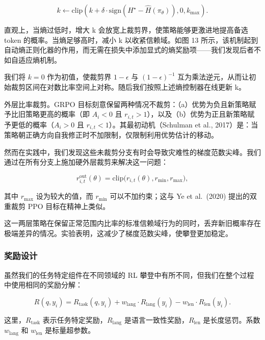 \documentclass[
  10
]{article}
\begin{document}
\[
k \gets \mathrm { c l i p } \left( k + \delta \cdot \mathrm { s i g n } \left( H ^ { \star } - \hat { H } ( \pi _ { \theta } ) \right) , 0 , k _ { \mathrm { m a x } } \right) .\tag{8}
\]

直观上，当熵过低时，增大 k 会放宽上裁剪界，使策略能够更激进地提高备选 token 的概率。当熵足够高时，减小 k 以收紧信赖域。如图 13 所示，该机制起到自动熵正则化器的作用，而无需在损失中添加显式的熵奖励项——我们发现后者不如自适应熵机制。

我们将 \(k = 0\) 作为初值，使裁剪界 $1 - \epsilon$ 与 \(( 1 - \epsilon ) ^ { - 1 }\) 互为乘法逆元，从而让初始裁剪区间在对数比率空间上对称。随后我们按照上述熵控制器在线更新 k。

外层比率裁剪。GRPO 目标刻意保留两种情况不裁剪：（a）优势为负且新策略赋予比旧策略更高的概率（即 \(A _ { i } < 0\) 且 \(r _ { i , t } > 1\)），以及（b）优势为正且新策略赋予更低的概率（\(A _ { i } > 0\) 且 \(r _ { i , t } < 1\)）。其最初动机（Schulman et al., 2017）是：当策略朝正确方向自我修正时不加限制，仅限制利用优势估计的移动。



然而在实践中，我们发现这些未裁剪分支有时会导致灾难性的梯度范数尖峰。我们通过在所有分支上施加硬外层裁剪来解决这一问题：

\[
r _ { i , t } ^ { \mathrm { o u t } } ( \theta ) = \mathrm { c l i p } \big ( r _ { i , t } ( \theta ) , r _ { \mathrm { m i n } } , r _ { \mathrm { m a x } } \big ) ,\tag{9}
\]

其中 \(r _ { \mathrm { m a x } }\) 设为较大的值，而 \(r _ { \mathrm { m i n } }\) 可以不加约束；这与 Ye et al.~(2020) 提出的双重裁剪 PPO 目标在精神上类似。

这一两层策略在保留正常范围内比率的标准信赖域行为的同时，丢弃新旧概率存在极端差异的情况。实验表明，这减少了梯度范数尖峰，使攀登更加稳定。

\subsubsection{奖励设计}\label{reward-design}

虽然我们的任务特定组件在不同领域的 RL 攀登中有所不同，但我们在整个过程中使用相同的奖励分解：

\[
R ( q , y _ { i } ) = R _ { \mathrm { t a s k } } ( q , y _ { i } ) + w _ { \mathrm { l a n g } } \cdot R _ { \mathrm { l a n g } } ( y _ { i } ) - w _ { \mathrm { l e n } } \cdot R _ { \mathrm { l e n } } ( y _ { i } ) .\tag{10}
\]

这里，\(R _ { \mathrm { t a s k } }\) 表示任务特定奖励，\(R _ { \mathrm { l a n g } }\) 是语言一致性奖励，\(R _ { \mathrm { l e n } }\) 是长度惩罚。系数 \(w _ { \mathrm { l a n g } }\) 和 \(w _ { \mathrm { l e n } }\) 是标量超参数。
\end{document}

